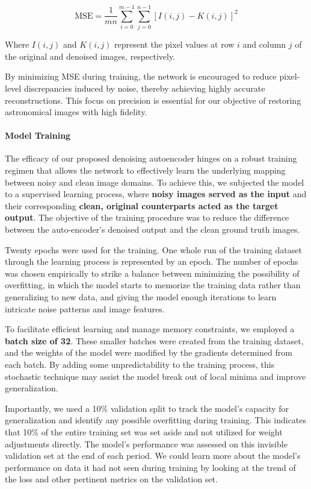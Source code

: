 \documentclass[12pt, conference]{IEEEtran}
\begin{document}
\begin{equation}
\text{MSE} = \frac{1}{mn} \sum_{i=0}^{m-1} \sum_{j=0}^{n-1} [I(i, j) - K(i, j)]^2
\end{equation}

Where $I(i,j)$ and $K(i,j)$ represent the pixel values at row $i$ and column $j$ of the original and denoised images, respectively.

By minimizing MSE during training, the network is encouraged to reduce pixel-level discrepancies induced by noise, thereby achieving highly accurate reconstructions. This focus on precision is essential for our objective of restoring astronomical images with high fidelity.

\paragraph{Model Training}
The efficacy of our proposed denoising autoencoder hinges on a robust training regimen that allows the network to effectively learn the underlying mapping between noisy and clean image domains. To achieve this, we subjected the model to a supervised learning process, where \textbf{noisy images served as the input} and their corresponding \textbf{clean, original counterparts acted as the target output}. The objective of the training procedure was to reduce the difference between the auto-encoder's denoised output and the clean ground truth images.

Twenty epochs were used for the training. One whole run of the training dataset through the learning process is represented by an epoch. The number of epochs was chosen empirically to strike a balance between minimizing the possibility of overfitting, in which the model starts to memorize the training data rather than generalizing to new data, and giving the model enough iterations to learn intricate noise patterns and image features.

To facilitate efficient learning and manage memory constraints, we employed a \textbf{batch size of 32}. These smaller batches were created from the training dataset, and the weights of the model were modified by the gradients determined from each batch. By adding some unpredictability to the training process, this stochastic technique may assist the model break out of local minima and improve generalization.

Importantly, we used a 10\% validation split to track the model's capacity for generalization and identify any possible overfitting during training. This indicates that 10\% of the entire training set was set aside and not utilized for weight adjustments directly. The model's performance was assessed on this invisible validation set at the end of each period. We could learn more about the model's performance on data it had not seen during training by looking at the trend of the loss and other pertinent metrics on the validation set.
\end{document}
